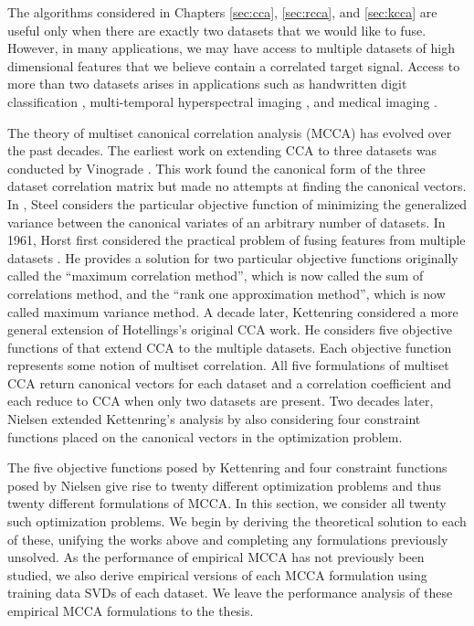 The algorithms considered in Chapters \ref{sec:cca}, \ref{sec:rcca}, and \ref{sec:kcca}
are useful only when there are exactly two datasets that we would like to fuse. However,
in many applications, we may have access to multiple datasets of high dimensional features
that we believe contain a correlated target signal. Access to more than two datasets
arises in applications such as handwritten digit classification \cite{yu2007learning},
multi-temporal hyperspectral imaging \cite{nielsen2002multiset}, and medical imaging
\cite{correa2010canonical, deleus2011functional}.

The theory of multiset canonical correlation analysis (MCCA) has evolved over the past
decades. The earliest work on extending CCA to three datasets was conducted by Vinograde
\cite{vinograde1950canonical}. This work found the canonical form of the three dataset
correlation matrix but made no attempts at finding the canonical vectors. In
\cite{steel1951minimum}, Steel considers the particular objective function of minimizing
the generalized variance between the canonical variates of an arbitrary number of
datasets. In 1961, Horst first considered the practical problem of fusing features from
multiple datasets \cite{horst1961relations,horst1961generalized}. He provides a solution
for two particular objective functions originally called the ``maximum correlation
method'', which is now called the sum of correlations method, and the ``rank one
approximation method'', which is now called maximum variance method. A decade later,
Kettenring \cite{kettenring1971canonical} considered a more general extension of
Hotellings's \cite{hotelling1936relations} original CCA work. He considers five objective
functions of that extend CCA to the multiple datasets. Each objective function represents
some notion of multiset correlation. All five formulations of multiset CCA return canonical
vectors for each dataset and a correlation coefficient and each reduce to CCA when only
two datasets are present. Two decades later, Nielsen \cite{nielsen1994analysis} extended
Kettenring's analysis by also considering four constraint functions placed on the
canonical vectors in the optimization problem.

The five objective functions posed by Kettenring and four constraint functions posed by
Nielsen give rise to twenty different optimization problems and thus twenty different
formulations of MCCA. In this section, we consider all twenty such optimization
problems. We begin by deriving the theoretical solution to each of these, unifying the
works above and completing any formulations previously unsolved. As the performance of
empirical MCCA has not previously been studied, we also derive empirical
versions of each MCCA formulation using training data SVDs of each dataset. We leave the
performance analysis of these empirical MCCA formulations to the thesis.

